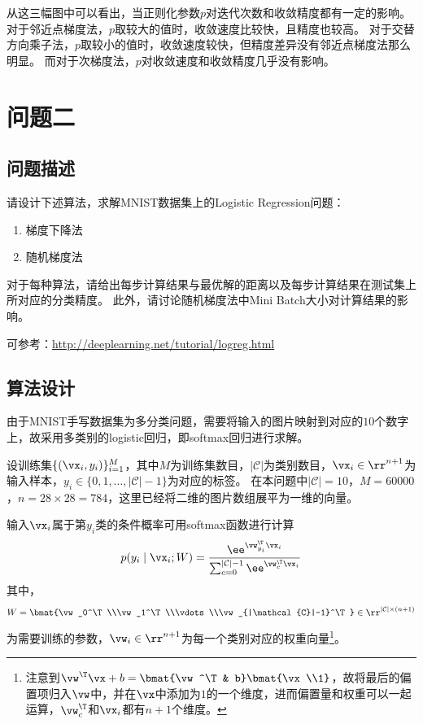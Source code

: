 \documentclass[logo,reportComp]{thesis}
\begin{document}
从这三幅图中可以看出，当正则化参数$p$对迭代次数和收敛精度都有一定的影响。
对于邻近点梯度法，$p$取较大的值时，收敛速度比较快，且精度也较高。
对于交替方向乘子法，$p$取较小的值时，收敛速度较快，但精度差异没有邻近点梯度法那么明显。
而对于次梯度法，$p$对收敛速度和收敛精度几乎没有影响。


\section{问题二}
\subsection{问题描述}
请设计下述算法，求解MNIST数据集上的Logistic Regression问题：
\begin{enumerate}
    \item 梯度下降法
    \item 随机梯度法
\end{enumerate}

对于每种算法，请给出每步计算结果与最优解的距离以及每步计算结果在测试集上所对应的分类精度。
此外，请讨论随机梯度法中Mini Batch大小对计算结果的影响。

可参考：\url{http://deeplearning.net/tutorial/logreg.html}

\subsection{算法设计}
由于MNIST手写数据集为多分类问题，需要将输入的图片映射到对应的$10$个数字上，故采用多类别的logistic回归，即softmax回归进行求解。

设训练集$\{(\vx_i,y_i)\}_{i=1}^M$，其中$M$为训练集数目，${|\mathcal{C}|}$为类别数目，$\vx_i\in\rr^{n+1}$为输入样本，$y_i\in\{0,1,\ldots,|\mathcal{C}|-1\}$为对应的标签。
在本问题中${|\mathcal{C}|}=10$，$M=60000$，$n=28\times 28=784$，这里已经将二维的图片数组展平为一维的向量。

输入$\vx_i$属于第$y_i$类的条件概率可用softmax函数进行计算
\begin{equation}
p(y_i\mid \vx_i;W)=\frac{\ee^{\vw_{y_i}^\T\vx_i}}{\sum_{c=0}^{|\mathcal{C}|-1}\ee^{\vw_c^\T\vx_i}}
\end{equation}
其中，
\[W=\bmat{\vw_0^\T\\\vw_1^\T\\\vdots\\\vw_{|\mathcal{C}|-1}^\T}\in\rr^{{|\mathcal{C}|}\times (n+1)}\]
为需要训练的参数，$\vw_i\in\rr^{n+1}$为每一个类别对应的权重向量\footnote{注意到$\vw^\T\vx+b=\bmat{\vw^\T & b}\bmat{\vx\\1}$，故将最后的偏置项归入$\vw$中，并在$\vx$中添加为$1$的一个维度，进而偏置量和权重可以一起运算，$\vw_c^\T$和$\vx_i$都有$n+1$个维度。}。
\end{document}
